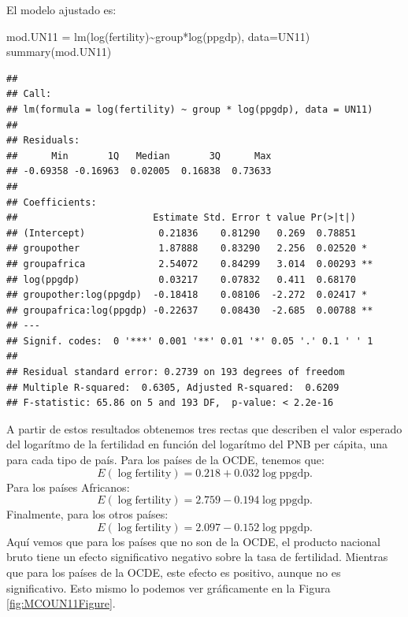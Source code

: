 \documentclass[
]{article}
\newenvironment{Shaded}{\begin{snugshade}}{\end{snugshade}}
\newcommand{\AttributeTok}[1]{\textcolor[rgb]{0.77,0.63,0.00}{#1}}
\newcommand{\FunctionTok}[1]{\textcolor[rgb]{0.00,0.00,0.00}{#1}}
\newcommand{\NormalTok}[1]{#1}
\newcommand{\OtherTok}[1]{\textcolor[rgb]{0.56,0.35,0.01}{#1}}
\newcommand{\SpecialCharTok}[1]{\textcolor[rgb]{0.00,0.00,0.00}{#1}}
\begin{document}
El modelo ajustado es:

\begin{Shaded}
\begin{Highlighting}[]
\NormalTok{mod.UN11 }\OtherTok{=} \FunctionTok{lm}\NormalTok{(}\FunctionTok{log}\NormalTok{(fertility)}\SpecialCharTok{\textasciitilde{}}\NormalTok{group}\SpecialCharTok{*}\FunctionTok{log}\NormalTok{(ppgdp), }\AttributeTok{data=}\NormalTok{UN11)}
\FunctionTok{summary}\NormalTok{(mod.UN11)}
\end{Highlighting}
\end{Shaded}

\begin{verbatim}
## 
## Call:
## lm(formula = log(fertility) ~ group * log(ppgdp), data = UN11)
## 
## Residuals:
##      Min       1Q   Median       3Q      Max 
## -0.69358 -0.16963  0.02005  0.16838  0.73633 
## 
## Coefficients:
##                        Estimate Std. Error t value Pr(>|t|)   
## (Intercept)             0.21836    0.81290   0.269  0.78851   
## groupother              1.87888    0.83290   2.256  0.02520 * 
## groupafrica             2.54072    0.84299   3.014  0.00293 **
## log(ppgdp)              0.03217    0.07832   0.411  0.68170   
## groupother:log(ppgdp)  -0.18418    0.08106  -2.272  0.02417 * 
## groupafrica:log(ppgdp) -0.22637    0.08430  -2.685  0.00788 **
## ---
## Signif. codes:  0 '***' 0.001 '**' 0.01 '*' 0.05 '.' 0.1 ' ' 1
## 
## Residual standard error: 0.2739 on 193 degrees of freedom
## Multiple R-squared:  0.6305, Adjusted R-squared:  0.6209 
## F-statistic: 65.86 on 5 and 193 DF,  p-value: < 2.2e-16
\end{verbatim}

A partir de estos resultados obtenemos tres rectas que describen el valor esperado del logarítmo de la fertilidad en función del logarítmo del PNB per cápita, una para cada tipo de país. Para los países de la OCDE, tenemos que:
\[
E(\log\mbox{fertility}) = 0.218 + 0.032\log \mbox{ppgdp}.
\]
Para los países Africanos:
\[
E(\log\mbox{fertility}) = 2.759  -0.194\log \mbox{ppgdp}.
\]
Finalmente, para los otros países:
\[
E(\log\mbox{fertility}) = 2.097  -0.152\log \mbox{ppgdp}.
\]
Aquí vemos que para los países que no son de la OCDE, el producto nacional bruto tiene un efecto significativo negativo sobre la tasa de fertilidad. Mientras que para los países de la OCDE, este efecto es positivo, aunque no es significativo. Esto mismo lo podemos ver gráficamente en la Figura \ref{fig:MCOUN11Figure}.
\end{document}
